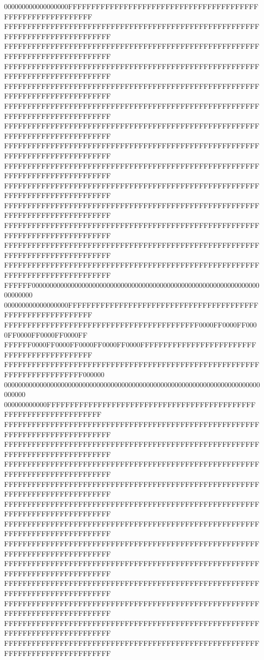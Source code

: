 000000000000000000FFFFFFFFFFFFFFFFFFFFFFFFFFFFFFFFFFFFFFFFFFFFFFFFFFFFFFFFFFFF
FFFFFFFFFFFFFFFFFFFFFFFFFFFFFFFFFFFFFFFFFFFFFFFFFFFFFFFFFFFFFFFFFFFFFFFFFFFFFF
FFFFFFFFFFFFFFFFFFFFFFFFFFFFFFFFFFFFFFFFFFFFFFFFFFFFFFFFFFFFFFFFFFFFFFFFFFFFFF
FFFFFFFFFFFFFFFFFFFFFFFFFFFFFFFFFFFFFFFFFFFFFFFFFFFFFFFFFFFFFFFFFFFFFFFFFFFFFF
FFFFFFFFFFFFFFFFFFFFFFFFFFFFFFFFFFFFFFFFFFFFFFFFFFFFFFFFFFFFFFFFFFFFFFFFFFFFFF
FFFFFFFFFFFFFFFFFFFFFFFFFFFFFFFFFFFFFFFFFFFFFFFFFFFFFFFFFFFFFFFFFFFFFFFFFFFFFF
FFFFFFFFFFFFFFFFFFFFFFFFFFFFFFFFFFFFFFFFFFFFFFFFFFFFFFFFFFFFFFFFFFFFFFFFFFFFFF
FFFFFFFFFFFFFFFFFFFFFFFFFFFFFFFFFFFFFFFFFFFFFFFFFFFFFFFFFFFFFFFFFFFFFFFFFFFFFF
FFFFFFFFFFFFFFFFFFFFFFFFFFFFFFFFFFFFFFFFFFFFFFFFFFFFFFFFFFFFFFFFFFFFFFFFFFFFFF
FFFFFFFFFFFFFFFFFFFFFFFFFFFFFFFFFFFFFFFFFFFFFFFFFFFFFFFFFFFFFFFFFFFFFFFFFFFFFF
FFFFFFFFFFFFFFFFFFFFFFFFFFFFFFFFFFFFFFFFFFFFFFFFFFFFFFFFFFFFFFFFFFFFFFFFFFFFFF
FFFFFFFFFFFFFFFFFFFFFFFFFFFFFFFFFFFFFFFFFFFFFFFFFFFFFFFFFFFFFFFFFFFFFFFFFFFFFF
FFFFFFFFFFFFFFFFFFFFFFFFFFFFFFFFFFFFFFFFFFFFFFFFFFFFFFFFFFFFFFFFFFFFFFFFFFFFFF
FFFFFFFFFFFFFFFFFFFFFFFFFFFFFFFFFFFFFFFFFFFFFFFFFFFFFFFFFFFFFFFFFFFFFFFFFFFFFF
FFFFFF000000000000000000000000000000000000000000000000000000000000000000000000
000000000000000000FFFFFFFFFFFFFFFFFFFFFFFFFFFFFFFFFFFFFFFFFFFFFFFFFFFFFFFFFFFF
FFFFFFFFFFFFFFFFFFFFFFFFFFFFFFFFFFFFFFFFFF0000FF0000FF0000FF0000FF0000FF0000FF
FFFFFF0000FF0000FF0000FF0000FF0000FFFFFFFFFFFFFFFFFFFFFFFFFFFFFFFFFFFFFFFFFFFF
FFFFFFFFFFFFFFFFFFFFFFFFFFFFFFFFFFFFFFFFFFFFFFFFFFFFFFFFFFFFFFFFFFFFFFFF000000
000000000000000000000000000000000000000000000000000000000000000000000000000000
000000000000FFFFFFFFFFFFFFFFFFFFFFFFFFFFFFFFFFFFFFFFFFFFFFFFFFFFFFFFFFFFFFFFFF
FFFFFFFFFFFFFFFFFFFFFFFFFFFFFFFFFFFFFFFFFFFFFFFFFFFFFFFFFFFFFFFFFFFFFFFFFFFFFF
FFFFFFFFFFFFFFFFFFFFFFFFFFFFFFFFFFFFFFFFFFFFFFFFFFFFFFFFFFFFFFFFFFFFFFFFFFFFFF
FFFFFFFFFFFFFFFFFFFFFFFFFFFFFFFFFFFFFFFFFFFFFFFFFFFFFFFFFFFFFFFFFFFFFFFFFFFFFF
FFFFFFFFFFFFFFFFFFFFFFFFFFFFFFFFFFFFFFFFFFFFFFFFFFFFFFFFFFFFFFFFFFFFFFFFFFFFFF
FFFFFFFFFFFFFFFFFFFFFFFFFFFFFFFFFFFFFFFFFFFFFFFFFFFFFFFFFFFFFFFFFFFFFFFFFFFFFF
FFFFFFFFFFFFFFFFFFFFFFFFFFFFFFFFFFFFFFFFFFFFFFFFFFFFFFFFFFFFFFFFFFFFFFFFFFFFFF
FFFFFFFFFFFFFFFFFFFFFFFFFFFFFFFFFFFFFFFFFFFFFFFFFFFFFFFFFFFFFFFFFFFFFFFFFFFFFF
FFFFFFFFFFFFFFFFFFFFFFFFFFFFFFFFFFFFFFFFFFFFFFFFFFFFFFFFFFFFFFFFFFFFFFFFFFFFFF
FFFFFFFFFFFFFFFFFFFFFFFFFFFFFFFFFFFFFFFFFFFFFFFFFFFFFFFFFFFFFFFFFFFFFFFFFFFFFF
FFFFFFFFFFFFFFFFFFFFFFFFFFFFFFFFFFFFFFFFFFFFFFFFFFFFFFFFFFFFFFFFFFFFFFFFFFFFFF
FFFFFFFFFFFFFFFFFFFFFFFFFFFFFFFFFFFFFFFFFFFFFFFFFFFFFFFFFFFFFFFFFFFFFFFFFFFFFF
FFFFFFFFFFFFFFFFFFFFFFFFFFFFFFFFFFFFFFFFFFFFFFFFFFFFFFFFFFFFFFFFFFFFFFFFFFFFFF
